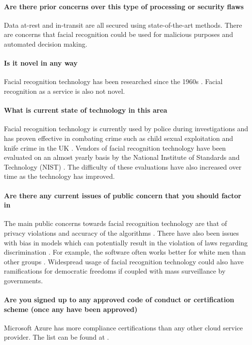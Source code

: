 \documentclass[12pt]{extarticle}
\begin{document}
\paragraph{Are there prior concerns over this type of processing or security flaws}
Data at-rest and in-transit are all secured using state-of-the-art methods. 
There are concerns that facial recognition could be used for malicious purposes and automated decision making.

\paragraph{Is it novel in any way}
Facial recognition technology has been researched since the 1960s \cite{firstface}. 
Facial recognition as a service is also not novel. 

\paragraph{What is current state of technology in this area}
Facial recognition technology is currently used by police during investigations and has proven effective in combating crime such as child sexual exploitation and knife crime in the UK \cite{police}.
Vendors of facial recognition technology have been evaluated on an almost yearly basis by the National Institute of Standards and Technology (NIST) \cite{nist}. 
The difficulty of these evaluations have also increased over time as the technology has improved.

\paragraph{Are there any current issues of public concern that you should factor in}
The main public concerns towards facial recognition technology are that of privacy violations and accuracy of the algorithms \cite{engineersurvey}. 
There have also been issues with bias in models which can potentially result in the violation of laws regarding discrimination \cite{timeforaction}. 
For example, the software often works better for white men than other groups \cite{Buolamwini2018GenderSI}. 
Widespread usage of facial recognition technology could also have ramifications for democratic freedoms if coupled with mass surveillance by governments.

\paragraph{Are you signed up to any approved code of conduct or certification scheme (once any have been approved)} Microsoft Azure has more compliance certifications than any other cloud service provider. 
The list can be found at \cite{microsoftcerts}.
\end{document}
